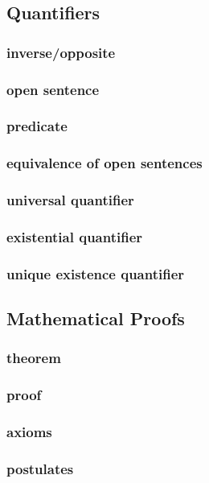 \documentclass[a4paper]{article}
\begin{document}
\newpage
\subsection{Quantifiers}   %
\subsubsection*{inverse/opposite}
\subsubsection*{open sentence}
\subsubsection*{predicate}
\subsubsection*{equivalence of open sentences}
\subsubsection*{universal quantifier}
\subsubsection*{existential quantifier}
\subsubsection*{unique existence quantifier}

\newpage
\subsection{Mathematical Proofs}   %
\subsubsection*{theorem}
\subsubsection*{proof}
\subsubsection*{axioms}
\subsubsection*{postulates}
\end{document}
